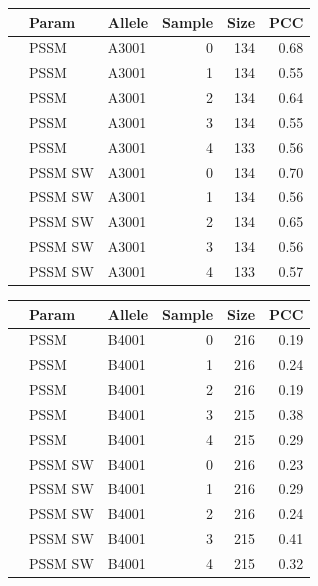 \documentclass[presentation]{beamer}   %
\begin{document}
\begin{frame}
\begin{table}\scriptsize

\begin{center}


\begin{tabular}{rllrrr}
  \hline
 & Param & Allele & Sample & Size & PCC \\ 
  \hline
   & PSSM & A3001 &   0 & 134 & 0.68 \\ 
   & PSSM & A3001 &   1 & 134 & 0.55 \\ 
   & PSSM & A3001 &   2 & 134 & 0.64 \\ 
   & PSSM & A3001 &   3 & 134 & 0.55 \\ 
   & PSSM & A3001 &   4 & 133 & 0.56 \\ 
  \hline
   & PSSM SW & A3001 &   0 & 134 & 0.70 \\ 
   & PSSM SW & A3001 &   1 & 134 & 0.56 \\ 
   & PSSM SW & A3001 &   2 & 134 & 0.65 \\ 
   & PSSM SW & A3001 &   3 & 134 & 0.56 \\ 
   & PSSM SW & A3001 &   4 & 133 & 0.57 \\ 
   \hline
\end{tabular}

\end{center}
\end{table}
\end{frame}

\begin{frame}
\begin{table}\scriptsize

\begin{center}
\begin{tabular}{rllrrr}
  \hline
 & Param & Allele & Sample & Size & PCC \\ 
  \hline
   & PSSM & B4001 &   0 & 216 & 0.19 \\ 
   & PSSM & B4001 &   1 & 216 & 0.24 \\ 
   & PSSM & B4001 &   2 & 216 & 0.19 \\ 
   & PSSM & B4001 &   3 & 215 & 0.38 \\ 
   & PSSM & B4001 &   4 & 215 & 0.29 \\ 
\hline
   & PSSM SW & B4001 &   0 & 216 & 0.23 \\ 
   & PSSM SW & B4001 &   1 & 216 & 0.29 \\ 
   & PSSM SW & B4001 &   2 & 216 & 0.24 \\ 
   & PSSM SW & B4001 &   3 & 215 & 0.41 \\ 
   & PSSM SW & B4001 &   4 & 215 & 0.32 \\ 
   \hline
\end{tabular}
\end{center}
\end{table}
\end{frame}
\end{document}
